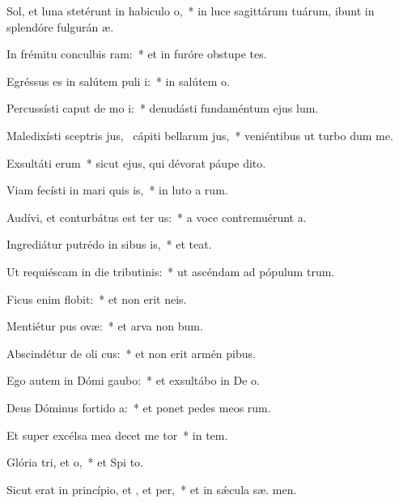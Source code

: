 \item Sol, et luna stetérunt in habiculo o,~* in luce sagittárum tuárum, ibunt in splendóre fulgurán  æ.
\item In frémitu conculbis ram:~* et in furóre obstupe tes.
\item Egréssus es in salútem puli i:~* in salútem   o.
\item Percussísti caput de mo i:~* denudásti fundaméntum ejus   lum.
\item Maledixísti sceptris jus,~\pscross{} cápiti bellarum jus,~* veniéntibus ut turbo  dum me.
\item Exsultáti erum~* sicut ejus, qui dévorat páupe  dito.
\item Viam fecísti in mari quis is,~* in luto a rum.
\item Audívi, et conturbátus est ter us:~* a voce contremuérunt  a.
\item Ingrediátur putrédo in sibus is,~* et   teat.
\item Ut requiéscam in die tributinis:~* ut ascéndam ad pópulum  trum.
\item Ficus enim  flobit:~* et non erit   neis.
\item Mentiétur pus ovæ:~* et arva non  bum.
\item Abscindétur de oli cus:~* et non erit armén  pibus.
\item Ego autem in Dómi gaubo:~* et exsultábo in De  o.
\item Deus Dóminus fortido a:~* et ponet pedes meos  rum.
\item Et super excélsa mea decet me tor~* in  tem.
\item Glória tri, et o,~* et Spi to.
\item Sicut erat in princípio, et , et per,~* et in sǽcula sæ. men.
